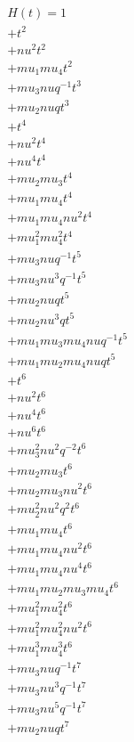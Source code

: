 \begin{align*}
H(t) = {}1 \\
  + t^{2} \\
  + nu^{2} t^{2} \\
  + mu_1 mu_4 t^{2} \\
  + mu_3 nu q^{-1} t^{3} \\
  + mu_2 nu q t^{3} \\
  + t^{4} \\
  + nu^{2} t^{4} \\
  + nu^{4} t^{4} \\
  + mu_2 mu_3 t^{4} \\
  + mu_1 mu_4 t^{4} \\
  + mu_1 mu_4 nu^{2} t^{4} \\
  + mu_1^{2} mu_4^{2} t^{4} \\
  + mu_3 nu q^{-1} t^{5} \\
  + mu_3 nu^{3} q^{-1} t^{5} \\
  + mu_2 nu q t^{5} \\
  + mu_2 nu^{3} q t^{5} \\
  + mu_1 mu_3 mu_4 nu q^{-1} t^{5} \\
  + mu_1 mu_2 mu_4 nu q t^{5} \\
  + t^{6} \\
  + nu^{2} t^{6} \\
  + nu^{4} t^{6} \\
  + nu^{6} t^{6} \\
  + mu_3^{2} nu^{2} q^{-2} t^{6} \\
  + mu_2 mu_3 t^{6} \\
  + mu_2 mu_3 nu^{2} t^{6} \\
  + mu_2^{2} nu^{2} q^{2} t^{6} \\
  + mu_1 mu_4 t^{6} \\
  + mu_1 mu_4 nu^{2} t^{6} \\
  + mu_1 mu_4 nu^{4} t^{6} \\
  + mu_1 mu_2 mu_3 mu_4 t^{6} \\
  + mu_1^{2} mu_4^{2} t^{6} \\
  + mu_1^{2} mu_4^{2} nu^{2} t^{6} \\
  + mu_1^{3} mu_4^{3} t^{6} \\
  + mu_3 nu q^{-1} t^{7} \\
  + mu_3 nu^{3} q^{-1} t^{7} \\
  + mu_3 nu^{5} q^{-1} t^{7} \\
  + mu_2 nu q t^{7} \\

\end{align*}
